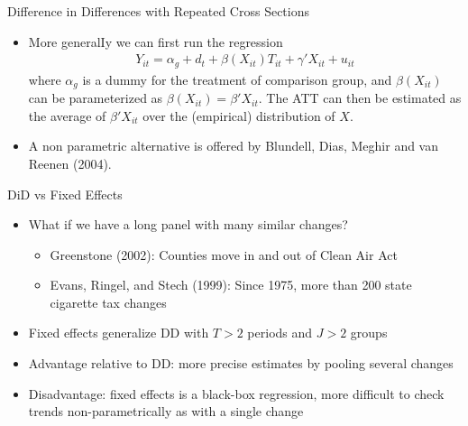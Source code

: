 \begin{frame}{Difference in Differences with Repeated Cross Sections}
\begin{itemize}
\item More generalIy we can first run the regression 
\begin{align*}
Y_{it} = \alpha_g + d_t + \beta (X_{it}) T_{it} + \gamma' X_{it} + u_{it}
\end{align*} 
where $\alpha_g$ is a dummy for the treatment of comparison group, and $\beta (X_{it})$ can be parameterized as $\beta(X_{it}) = \beta' X_{it}$. The ATT can then be estimated as the average of $\beta' X_{it}$ over the (empirical) distribution of $X$.
\item A non parametric alternative is offered by Blundell, Dias, Meghir and van Reenen (2004).
\end{itemize}
\end{frame}

\begin{frame}{DiD vs Fixed Effects}
  \begin{itemize}
  \item What if we have a long panel with many similar changes? 
  \begin{itemize}
    \item Greenstone (2002): Counties move in and out of Clean Air Act
    \item Evans, Ringel, and Stech (1999): Since 1975, more than 200 state cigarette tax changes 
  \end{itemize}
  \item Fixed effects generalize DD with $T > 2$ periods and $J > 2$ groups
  \item Advantage relative to DD: more precise estimates by pooling several
  changes
  \item Disadvantage: fixed effects is a black-box regression, more difficult to
  check trends non-parametrically as with a single change
  \end{itemize}
\end{frame}

